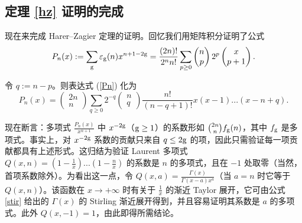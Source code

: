 
\subsection{定理 \ref{hz} 证明的完成}

现在来完成 Harer–Zagier 定理的证明。回忆我们用矩阵积分证明了公式
\begin{equation}\label{Pn}
P_n(x):=\sum_{\rm g} \varepsilon_{\rm g}(n)x^{n+1-2{\rm g}}
=\frac{(2n)!}{2^nn!}\sum_{p\ge 0}\begin{pmatrix} n\\ p\end{pmatrix}
2^p\begin{pmatrix} x\\ p+1\end{pmatrix}.
\end{equation}

令 $q:=n-p$。则表达式 (\ref{Pn}) 化为
\begin{equation}\label{Pn1}
P_n(x)=\begin{pmatrix} 2n\\ n\end{pmatrix}
\sum_{q\ge 0}2^{-q}\begin{pmatrix} n\\ q\end{pmatrix}\frac{n!}{(n-q+1)!}
x(x-1)...(x-n+q).
\end{equation}

现在断言：多项式 $\frac{P_n(x)}{x^{n+1}}$ 中 $x^{-2{\rm g}}$（${\rm g}\ge 1$）的系数形如 $\binom{2n}{n}f_{\rm g}(n)$，其中 $f_{\rm g}$ 是多项式。事实上，对 $x^{-2{\rm g}}$ 系数的贡献只来自 $q\le 2{\rm g}$ 的项，因此只需验证每一项贡献都具有上述形式。这归结为验证 Laurent 多项式 $Q(x,n)=(1-\frac{1}{x})...(1-\frac{n}{x})$ 的系数是 $n$ 的多项式，且在 $-1$ 处取零（当然，首项系数除外）。为看出这一点，令 $Q(x,a)=\frac{\Gamma(x)}{\Gamma(x-a)x^a}$（当 $a=n$ 时它等于 $Q(x,n)$）。该函数在 $x\to +\infty$ 时有关于 $\frac{1}{x}$ 的渐近 Taylor 展开，它可由公式 \eqref{stir} 给出的 $\Gamma(x)$ 的 Stirling 渐近展开得到，并且容易证明其系数是 $a$ 的多项式。此外 $Q(x,-1)=1$，由此即得所需结论。

